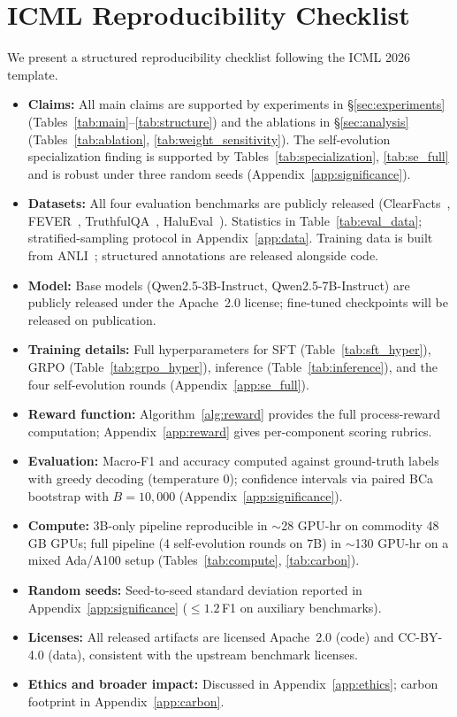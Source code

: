 \documentclass{article}
\begin{document}
\section{ICML Reproducibility Checklist}
\label{app:repro_checklist}

We present a structured reproducibility checklist following the ICML 2026 template.

\begin{itemize}[nosep,leftmargin=*]
\item \textbf{Claims:} All main claims are supported by experiments in \S\ref{sec:experiments} (Tables~\ref{tab:main}--\ref{tab:structure}) and the ablations in \S\ref{sec:analysis} (Tables~\ref{tab:ablation}, \ref{tab:weight_sensitivity}). The self-evolution specialization finding is supported by Tables~\ref{tab:specialization}, \ref{tab:se_full} and is robust under three random seeds (Appendix~\ref{app:significance}).
\item \textbf{Datasets:} All four evaluation benchmarks are publicly released (ClearFacts~\citep{seo2025vtv}, FEVER~\citep{thorne2018fever}, TruthfulQA~\citep{lin2022truthfulqa}, HaluEval~\citep{li2023halueval}). Statistics in Table~\ref{tab:eval_data}; stratified-sampling protocol in Appendix~\ref{app:data}. Training data is built from ANLI~\citep{nie2020adversarial}; structured annotations are released alongside code.
\item \textbf{Model:} Base models (Qwen2.5-3B-Instruct, Qwen2.5-7B-Instruct) are publicly released under the Apache~2.0 license; fine-tuned checkpoints will be released on publication.
\item \textbf{Training details:} Full hyperparameters for SFT (Table~\ref{tab:sft_hyper}), GRPO (Table~\ref{tab:grpo_hyper}), inference (Table~\ref{tab:inference}), and the four self-evolution rounds (Appendix~\ref{app:se_full}).
\item \textbf{Reward function:} Algorithm~\ref{alg:reward} provides the full process-reward computation; Appendix~\ref{app:reward} gives per-component scoring rubrics.
\item \textbf{Evaluation:} Macro-F1 and accuracy computed against ground-truth labels with greedy decoding (temperature 0); confidence intervals via paired BCa bootstrap with $B{=}10{,}000$ (Appendix~\ref{app:significance}).
\item \textbf{Compute:} 3B-only pipeline reproducible in $\sim$28 GPU-hr on commodity 48\,GB GPUs; full pipeline (4 self-evolution rounds on 7B) in $\sim$130 GPU-hr on a mixed Ada/A100 setup (Tables~\ref{tab:compute}, \ref{tab:carbon}).
\item \textbf{Random seeds:} Seed-to-seed standard deviation reported in Appendix~\ref{app:significance} ($\leq 1.2$\,F1 on auxiliary benchmarks).
\item \textbf{Licenses:} All released artifacts are licensed Apache~2.0 (code) and CC-BY-4.0 (data), consistent with the upstream benchmark licenses.
\item \textbf{Ethics and broader impact:} Discussed in Appendix~\ref{app:ethics}; carbon footprint in Appendix~\ref{app:carbon}.
\end{itemize}
\end{document}
